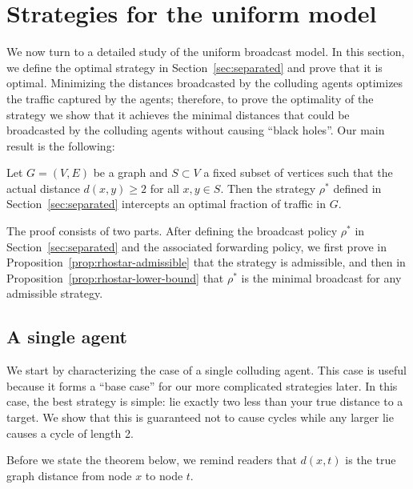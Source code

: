 \documentclass{comnet}
\begin{document}
\section{Strategies for the uniform model} \label{sec:strategies}

We now turn to a detailed study of the uniform broadcast model. In this
section, we define the optimal strategy in Section~\ref{sec:separated} and
prove that it is optimal. Minimizing the distances broadcasted by the colluding
agents optimizes the traffic captured by the agents; therefore, to prove the
optimality of the strategy we show that it achieves the minimal distances that
could be broadcasted by the colluding agents without causing ``black holes''.
Our main result is the following:

\begin{theorem} \label{thm:optimal-separated}

Let $G = (V,E)$ be a graph and $S \subset V$ a fixed subset of vertices such
that the actual distance $d(x, y) \geq 2$ for all $x,y \in S$. Then the
strategy $\rho^*$ defined in Section~\ref{sec:separated} intercepts an optimal
fraction of traffic in $G$.

\end{theorem}

The proof consists of two parts. After defining the broadcast policy $\rho^*$
in Section~\ref{sec:separated} and the associated forwarding policy, we first
prove in Proposition~\ref{prop:rhostar-admissible} that the strategy is
admissible, and then in Proposition~\ref{prop:rhostar-lower-bound} that
$\rho^*$ is the minimal broadcast for any admissible strategy.

\subsection{A single agent} \label{sec:single-agent}

We start by characterizing the case of a single colluding agent. This case is
useful because it forms a ``base case'' for our more complicated strategies
later. In this case, the best strategy is simple: lie exactly two less than
your true distance to a target. We show that this is guaranteed not to cause
cycles while any larger lie causes a cycle of length 2. 

Before we state the theorem below, we remind readers that $d(x,t)$ is the true
graph distance from node $x$ to node $t$.
\end{document}
